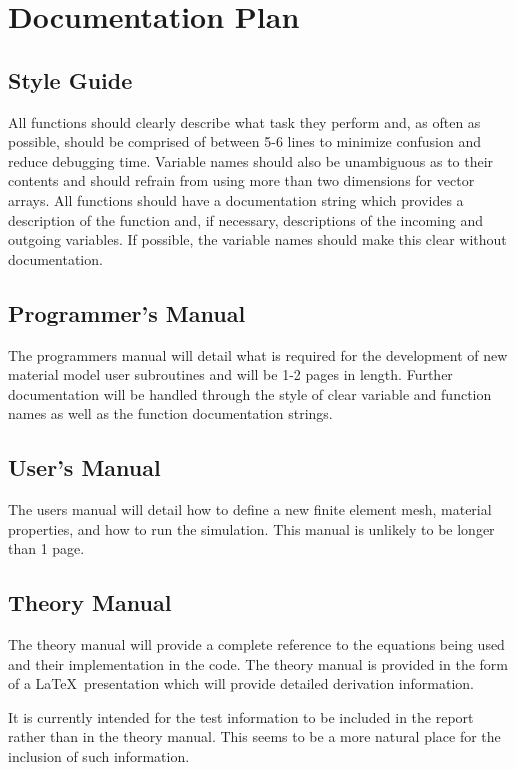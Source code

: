 \section{Documentation Plan}

\subsection{Style Guide}

All functions should clearly describe what task they perform and, as often as possible, should be comprised of between 5-6 lines to minimize confusion and reduce debugging time. Variable names should also be unambiguous as to their contents and should refrain from using more than two dimensions for vector arrays. All functions should have a documentation string which provides a description of the function and, if necessary, descriptions of the incoming and outgoing variables. If possible, the variable names should make this clear without documentation.

\subsection{Programmer's Manual}

The programmers manual will detail what is required for the development of new material model user subroutines and will be 1-2 pages in length. Further documentation will be handled through the style of clear variable and function names as well as the function documentation strings.

\subsection{User's Manual}

The users manual will detail how to define a new finite element mesh, material properties, and how to run the simulation. This manual is unlikely to be longer than 1 page.

\subsection{Theory Manual}

The theory manual will provide a complete reference to the equations being used and their implementation in the code. The theory manual is provided in the form of a \LaTeX~presentation which will provide detailed derivation information.

It is currently intended for the test information to be included in the report rather than in the theory manual. This seems to be a more natural place for the inclusion of such information.

